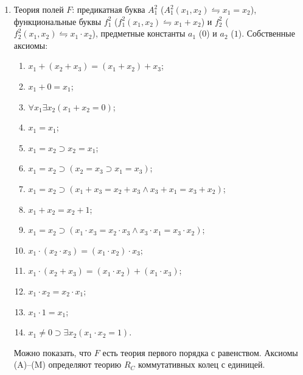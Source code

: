 \begin{enumerate}
    \item Теория полей $F$: предикатная буква $A_1^2$ ($A_1^2(x_1, x_2) \leftrightharpoons x_1 = x_2$), функциональные буквы $f_1^2$ ($f_1^2(x_1, x_2) \leftrightharpoons x_1 + x_2$) и $f_2^2$ ($f_2^2(x_1, x_2) \leftrightharpoons x_1\cdot x_2$), предметные константы $a_1$ ($0$) и $a_2$ ($1$). Собственные аксиомы:
    \begin{enumerate}[label=\Alph*.]
        \item $x_1 + (x_2 + x_3) = (x_1 + x_2) + x_3$;
        \item $x_1 + 0 = x_1$;
        \item $\forall x_1\exists x_2(x_1 + x_2 = 0)$;
        \item $x_1 = x_1$;
        \item $x_1 = x_2 \supset x_2 = x_1$;
        \item $x_1 = x_2 \supset (x_2 = x_3 \supset x_1 = x_3)$;
        \item $x_1 = x_2 \supset (x_1 + x_3 = x_2 + x_3 \land x_3 + x_1 = x_3 + x_2)$;
        \item $x_1 + x_2 = x_2 + 1$;
        \item $x_1 = x_2 \supset (x_1\cdot x_3 = x_2\cdot x_3 \land x_3 \cdot x_1 = x_3 \cdot x_2)$;
        \item $x_1\cdot(x_2\cdot x_3) = (x_1\cdot x_2)\cdot x_3$;
        \item $x_1\cdot(x_2 + x_3) = (x_1\cdot x_2) + (x_1\cdot x_3)$;
        \item $x_1\cdot x_2 = x_2\cdot x_1$;
        \item $x_1\cdot 1 = x_1$;
        \item $x_1 \neq 0 \supset \exists x_2(x_1\cdot x_2 = 1)$.
    \end{enumerate}
    Можно показать, что $F$ есть теория первого порядка с равенством. Аксиомы (A)--(M) определяют теорию $R_C$ коммутативных колец с единицей.
\end{enumerate}